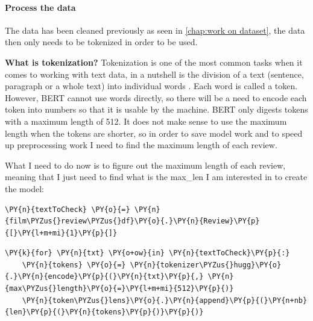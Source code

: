\paragraph{Process the data}
The data has been cleaned previously as seen in \autoref{chap:work on dataset}, the data then only needs to be tokenized in order to be used.  


\textbf{What is tokenization?}\cite{noauthor_what_2019}
Tokenization is one of the most common tasks when it comes to working with text data, in a nutshell is the division of a text (sentence, paragraph or a whole text) into individual words . Each word is called a token.
However, \gls{BERT} cannot use words directly, so there will be a need to encode each token into numbers so that it is usable by the machine.
\gls{BERT} only digests tokens with a maximum length of 512.
It does not make sense to use the maximum length when the tokens are shorter, so in order to save model work and to speed up preprocessing work I need to find the maximum length of each review.

What I need to do now is to figure out the maximum length of each review, meaning that I just need to find what is the max\_len I am interested in to create the model:

    \begin{tcolorbox}[breakable, size=fbox, boxrule=1pt, pad at break*=1mm,colback=cellbackground, colframe=cellborder]
\begin{Verbatim}[commandchars=\\\{\},fontsize=\footnotesize]
\PY{n}{textToCheck} \PY{o}{=} \PY{n}{film\PYZus{}review\PYZus{}df}\PY{o}{.}\PY{n}{Review}\PY{p}{[}\PY{l+m+mi}{1}\PY{p}{]}
\end{Verbatim}
\end{tcolorbox}

    \begin{tcolorbox}[breakable, size=fbox, boxrule=1pt, pad at break*=1mm,colback=cellbackground, colframe=cellborder]
\begin{Verbatim}[commandchars=\\\{\},fontsize=\footnotesize]
\PY{k}{for} \PY{n}{txt} \PY{o+ow}{in} \PY{n}{textToCheck}\PY{p}{:}
    \PY{n}{tokens} \PY{o}{=} \PY{n}{tokenizer\PYZus{}hugg}\PY{o}{.}\PY{n}{encode}\PY{p}{(}\PY{n}{txt}\PY{p}{,} \PY{n}{max\PYZus{}length}\PY{o}{=}\PY{l+m+mi}{512}\PY{p}{)}
    \PY{n}{token\PYZus{}lens}\PY{o}{.}\PY{n}{append}\PY{p}{(}\PY{n+nb}{len}\PY{p}{(}\PY{n}{tokens}\PY{p}{)}\PY{p}{)}
\end{Verbatim}
\end{tcolorbox}

